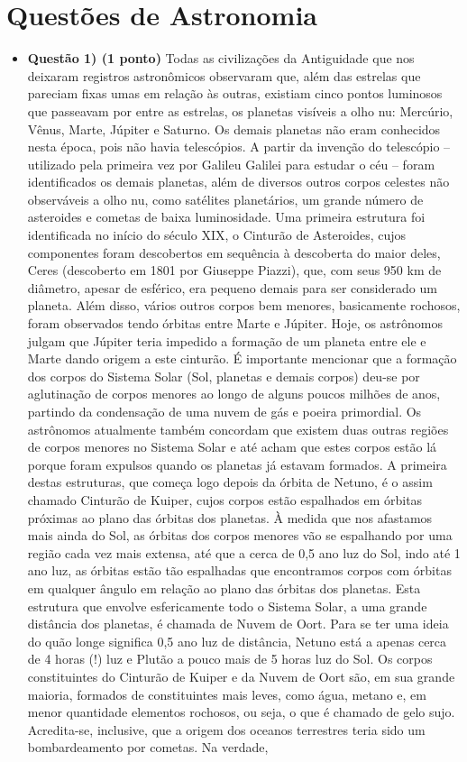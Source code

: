\documentclass[a4paper, 12pt]{article}
\begin{document}
    \section*{Questões de Astronomia}
        \begin{flushleft} \begin{itemize}
            \item \textbf{Questão 1) (1 ponto)} Todas as civilizações da Antiguidade que nos deixaram registros astronômicos observaram que, além das estrelas que pareciam fixas umas em relação às outras, existiam cinco pontos luminosos que passeavam por entre as estrelas, os planetas visíveis a olho nu: Mercúrio, Vênus, Marte, Júpiter e Saturno. Os demais planetas não eram conhecidos nesta época, pois não havia telescópios. A partir da invenção do telescópio – utilizado pela primeira vez por Galileu Galilei para estudar o céu – foram identificados os demais planetas, além de diversos outros corpos celestes não observáveis a olho nu, como satélites planetários, um grande número de asteroides e cometas de baixa luminosidade. Uma primeira estrutura foi identificada no início do século XIX, o Cinturão de Asteroides, cujos componentes foram descobertos em sequência à descoberta do maior deles, Ceres (descoberto em 1801 por Giuseppe Piazzi), que, com seus 950 km de diâmetro, apesar de esférico, era pequeno demais para ser considerado um planeta. Além disso, vários outros corpos bem menores, basicamente rochosos, foram observados tendo órbitas entre Marte e Júpiter. Hoje, os astrônomos julgam que Júpiter teria impedido a formação de um planeta entre ele e Marte dando origem a este cinturão. É importante mencionar que a formação dos corpos do Sistema Solar (Sol, planetas e demais corpos) deu-se por aglutinação de corpos menores ao longo de alguns poucos milhões de anos, partindo da condensação de uma nuvem de gás e poeira primordial. Os astrônomos atualmente também concordam que existem duas outras regiões de corpos menores no Sistema Solar e até acham que estes corpos estão lá porque foram expulsos quando os planetas já estavam formados. A primeira destas estruturas, que começa logo depois da órbita de Netuno, é o assim chamado Cinturão de Kuiper, cujos corpos estão espalhados em órbitas próximas ao plano das órbitas dos planetas. À medida que nos afastamos mais ainda do Sol, as órbitas dos corpos menores vão se espalhando por uma região cada vez mais extensa, até que a cerca de 0,5 ano luz do Sol, indo até 1 ano luz, as órbitas estão tão espalhadas que encontramos corpos com órbitas em qualquer ângulo em relação ao plano das órbitas dos planetas. Esta estrutura que envolve esfericamente todo o Sistema Solar, a uma grande distância dos planetas, é chamada de Nuvem de Oort. Para se ter uma ideia do quão longe significa 0,5 ano luz de distância, Netuno está a apenas cerca de 4 horas (!) luz e Plutão a pouco mais de 5 horas luz do Sol. Os corpos constituintes do Cinturão de Kuiper e da Nuvem de Oort são, em sua grande maioria, formados de constituintes mais leves, como água, metano e, em menor quantidade elementos rochosos, ou seja, o que é chamado de gelo sujo. Acredita-se, inclusive, que a origem dos oceanos terrestres teria sido um bombardeamento por cometas. Na verdade, 
\end{itemize}
\end{flushleft}
\end{document}
